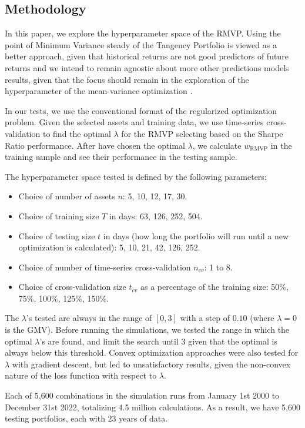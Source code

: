 \documentclass{article}
\begin{document}
\FloatBarrier
\subsection{Methodology}
In this paper, we explore the hyperparameter space of the RMVP. Using the point of Minimum Variance steady of the Tangency Portfolio is viewed as a better approach, given that historical returns are not good predictors of future returns and we intend to remain agnostic about more other predictions models results, given that the focus should remain in the exploration of the hyperparameter of the mean-variance optimization \cite{campbell2008predicting}.

In our tests, we use the conventional format of the regularized optimization problem. Given the selected assets and training data, we use time-series cross-validation to find the optimal $\lambda$ for the RMVP selecting based on the Sharpe Ratio performance. After have chosen the optimal $\lambda$, we calculate $w_{\text{RMVP}}$ in the training sample and see their performance in the testing sample.

The hyperparameter space tested is defined by the following parameters:
\begin{itemize}
    \item Choice of number of assets $n$: 5, 10, 12, 17, 30.
    \item Choice of training size $T$ in days: 63, 126, 252, 504.
    \item Choice of testing size $t$ in days (how long the portfolio will run until a new optimization is calculated): 5, 10, 21, 42, 126, 252.
    \item Choice of number of time-series cross-validation $n_{cv}$: 1 to 8.
    \item Choice of cross-validation size $t_{cv}$ as a percentage of the training size: 50\%, 75\%, 100\%, 125\%, 150\%.
\end{itemize}

The $\lambda$'s tested are always in the range of $[0, 3]$ with a step of $0.10$ (where $\lambda = 0$ is the GMV). Before running the simulations, we tested the range in which the optimal $\lambda$'s are found, and limit the search until $3$ given that the optimal is always below this threshold. Convex optimization approaches were also tested for $\lambda$ with gradient descent, but led to unsatisfactory results, given the non-convex nature of the loss function with respect to $\lambda$.

Each of 5,600 combinations in the simulation runs from January 1st 2000 to December 31st 2022, totalizing 4.5 million calculations. As a result, we have 5,600 testing portfolios, each with 23 years of data.
\end{document}

